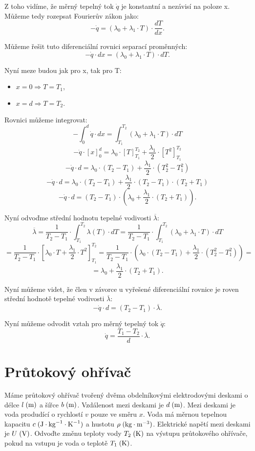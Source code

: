 \documentclass{article}
\begin{document}
Z toho vidíme, že měrný tepelný tok $\dot{q}$ je konstantní a nezávisí na poloze x. Můžeme tedy rozepsat Fourierův zákon jako:
$$
    - \dot{q} = \left( \lambda_0 + \lambda_1 \cdot T \right) \cdot \frac{dT}{dx}.
$$

Můžeme řešit tuto diferenciální rovnici separací proměnných:
$$
    - \dot{q} \cdot dx = \left( \lambda_0 + \lambda_1 \cdot T \right) \cdot dT.
$$

Nyní meze budou jak pro x, tak pro T:
\begin{itemize}
    \item $x = 0 \Rightarrow T = T_1$,
    \item $x = d \Rightarrow T = T_2$.
\end{itemize}

Rovnici můžeme integrovat:
$$
    - \int_{0}^{d} \dot{q} \cdot dx = \int_{T_1}^{T_2} \left( \lambda_0 + \lambda_1 \cdot T \right) \cdot dT
$$
$$
    - \dot{q} \cdot \left[ x \right]_{0}^{d} = \lambda_0 \cdot \left[ T \right]_{T_1}^{T_2} + \frac{\lambda_1}{2} \cdot \left[ T^2 \right]_{T_1}^{T_2}
$$
$$
    - \dot{q} \cdot d = \lambda_0 \cdot (T_2 - T_1) + \frac{\lambda_1}{2} \cdot (T_2^2 - T_1^2)
$$
$$
    - \dot{q} \cdot d = \lambda_0 \cdot (T_2 - T_1) + \frac{\lambda_1}{2} \cdot (T_2 - T_1) \cdot (T_2 + T_1)
$$
$$
    - \dot{q} \cdot d = (T_2 - T_1) \cdot \left( \lambda_0 + \frac{\lambda_1}{2} \cdot (T_2 + T_1) \right).
$$

Nyní odvoďme střední hodnotu tepelné vodivosti $\overline{\lambda}$:
$$
    \overline{\lambda} = \frac{1}{T_2 - T_1} \cdot \int_{T_1}^{T_2} \lambda (T) \cdot dT = \frac{1}{T_2 - T_1} \cdot \int_{T_1}^{T_2} \left( \lambda_0 + \lambda_1 \cdot T \right) \cdot dT
$$
$$
    = \frac{1}{T_2 - T_1} \cdot \left[ \lambda_0 \cdot T + \frac{\lambda_1}{2} \cdot T^2 \right]_{T_1}^{T_2} = \frac{1}{T_2 - T_1} \cdot \left( \lambda_0 \cdot (T_2 - T_1) + \frac{\lambda_1}{2} \cdot (T_2^2 - T_1^2) \right) =
$$
$$
    = \lambda_0 + \frac{\lambda_1}{2} \cdot (T_2 + T_1).
$$

Nyní můžeme videt, že člen v závorce u vyřešené diferenciální rovnice je roven střední hodnotě tepelné vodivosti $\overline{\lambda}$:
$$
    - \dot{q} \cdot d = (T_2 - T_1) \cdot \overline{\lambda}.
$$

Nyní můžeme odvodit vztah pro měrný tepelný tok $\dot{q}$:
$$
    \dot{q} = \frac{T_1 - T_2}{d} \cdot \overline{\lambda}.
$$

\newpage




\section{ Průtokový ohřívač \spicy \spicy \spicy \spicy}
Máme průtokový ohřívač tvořený dvěma obdelníkovými elektrodovými deskami o délce $l \; (\textrm{m})$ a šířce $b \; (\textrm{m})$. Vzdálenost mezi deskami je $d \; (\textrm{m})$. Mezi deskami je voda produdící o rychlostí $v$ pouze ve směru $x$. Voda má měrnou tepelnou kapacitu $c \; (\textrm{J} \cdot \textrm{kg}^{-1} \cdot \textrm{K}^{-1})$ a hustotu $\rho \; (\textrm{kg} \cdot \textrm{m}^{-3})$. Elektrické napětí mezi deskami je $U \; (\textrm{V})$. Odvoďte změnu teploty vody $T_2 \; (\textrm{K})$ na výstupu průtokového ohřívače, pokud na vstupu je voda o teplotě $T_1 \; (\textrm{K})$.\\
\end{document}
